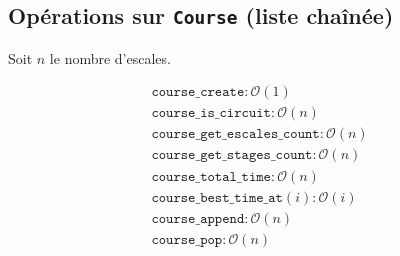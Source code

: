 \subsection{Opérations sur \texttt{Course} (liste chaînée)}

Soit $n$ le nombre d'escales.

\begin{align*}
\texttt{course\_create} : \mathcal{O}(1)\\
\texttt{course\_is\_circuit} : \mathcal{O}(n)\\
\texttt{course\_get\_escales\_count} : \mathcal{O}(n) \\
\texttt{course\_get\_stages\_count} : \mathcal{O}(n) \\
\texttt{course\_total\_time} : \mathcal{O}(n) \\
\texttt{course\_best\_time\_at}(i) : \mathcal{O}(i) \\
\texttt{course\_append} : \mathcal{O}(n) \\
\texttt{course\_pop} : \mathcal{O}(n)
\end{align*}
